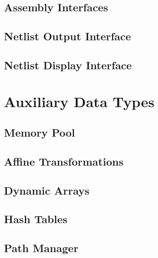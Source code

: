 \documentclass[10pt]{report}
\begin{document}
\chapter{Assembly Interfaces}


\chapter{Netlist Output Interface}


\chapter{Netlist Display Interface}



\part{Auxiliary Data Types}

\chapter{Memory Pool}


\chapter{Affine Transformations}


\chapter{Dynamic Arrays}


\chapter{Hash Tables}


\chapter{Path Manager}



\nocite{*}


\end{document}
